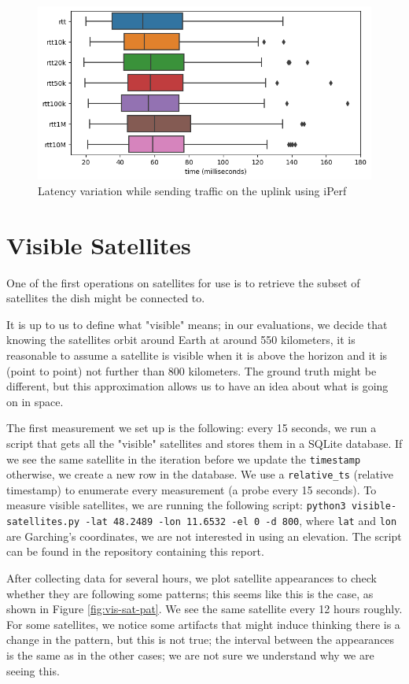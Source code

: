 \documentclass[IN,11pt,twoside,openright,idp,english]{tumthesis}
\begin{document}
\begin{figure}
    \centering
    \includegraphics[width=0.6\columnwidth]{img/latency_iperf.png}
    \caption{Latency variation while sending traffic on the uplink using iPerf}
\end{figure}

\section{Visible Satellites}
One of the first operations on satellites for use is to retrieve the subset of satellites the dish might be connected to.

It is up to us to define what "visible" means; in our evaluations, we decide that knowing the satellites orbit around Earth at around 550 kilometers, it is reasonable to assume a satellite is visible when it is above the horizon and it is (point to point) not further than 800 kilometers. The ground truth might be different, but this approximation allows us to have an idea about what is going on in space. 

The first measurement we set up is the following: every 15 seconds, we run a script that gets all the "visible" satellites and stores them in a SQLite database. If we see the same satellite in the iteration before we update the \texttt{timestamp} otherwise, we create a new row in the database. We use a \texttt{relative\_ts} (relative timestamp) to enumerate every measurement (a probe every 15 seconds). To measure visible satellites, we are running the following script: \texttt{python3 visible-satellites.py -lat 48.2489 -lon 11.6532 -el 0 -d 800}, where \texttt{lat} and \texttt{lon} are Garching's coordinates, we are not interested in using an elevation. The script can be found in the repository containing this report.

After collecting data for several hours, we plot satellite appearances to check whether they are following some patterns; this seems like this is the case, as shown in Figure \ref{fig:vis-sat-pat}. We see the same satellite every 12 hours roughly. For some satellites, we notice some artifacts that might induce thinking there is a change in the pattern, but this is not true; the interval between the appearances is the same as in the other cases; we are not sure we understand why we are seeing this.
\end{document}

